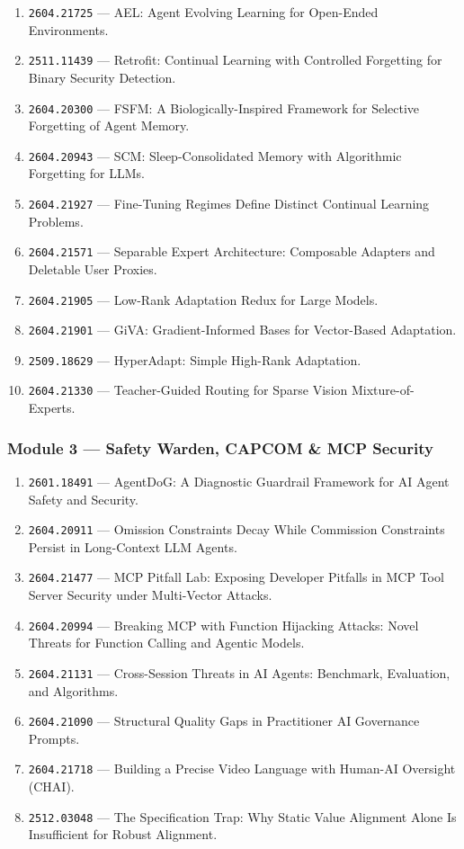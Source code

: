 \documentclass[11pt,letterpaper]{article}
\newcommand{\arxivid}[1]{\texttt{\textcolor{accent}{#1}}}
\begin{document}
\begin{enumerate}[leftmargin=*]
\item \arxivid{2604.21725} --- AEL: Agent Evolving Learning for Open-Ended Environments.
\item \arxivid{2511.11439} --- Retrofit: Continual Learning with Controlled Forgetting for Binary Security Detection.
\item \arxivid{2604.20300} --- FSFM: A Biologically-Inspired Framework for Selective Forgetting of Agent Memory.
\item \arxivid{2604.20943} --- SCM: Sleep-Consolidated Memory with Algorithmic Forgetting for LLMs.
\item \arxivid{2604.21927} --- Fine-Tuning Regimes Define Distinct Continual Learning Problems.
\item \arxivid{2604.21571} --- Separable Expert Architecture: Composable Adapters and Deletable User Proxies.
\item \arxivid{2604.21905} --- Low-Rank Adaptation Redux for Large Models.
\item \arxivid{2604.21901} --- GiVA: Gradient-Informed Bases for Vector-Based Adaptation.
\item \arxivid{2509.18629} --- HyperAdapt: Simple High-Rank Adaptation.
\item \arxivid{2604.21330} --- Teacher-Guided Routing for Sparse Vision Mixture-of-Experts.
\end{enumerate}

\subsubsection{Module 3 --- Safety Warden, CAPCOM \& MCP Security}

\begin{enumerate}[leftmargin=*]
\item \arxivid{2601.18491} --- AgentDoG: A Diagnostic Guardrail Framework for AI Agent Safety and Security.
\item \arxivid{2604.20911} --- Omission Constraints Decay While Commission Constraints Persist in Long-Context LLM Agents.
\item \arxivid{2604.21477} --- MCP Pitfall Lab: Exposing Developer Pitfalls in MCP Tool Server Security under Multi-Vector Attacks.
\item \arxivid{2604.20994} --- Breaking MCP with Function Hijacking Attacks: Novel Threats for Function Calling and Agentic Models.
\item \arxivid{2604.21131} --- Cross-Session Threats in AI Agents: Benchmark, Evaluation, and Algorithms.
\item \arxivid{2604.21090} --- Structural Quality Gaps in Practitioner AI Governance Prompts.
\item \arxivid{2604.21718} --- Building a Precise Video Language with Human-AI Oversight (CHAI).
\item \arxivid{2512.03048} --- The Specification Trap: Why Static Value Alignment Alone Is Insufficient for Robust Alignment.
\end{enumerate}
\end{document}

